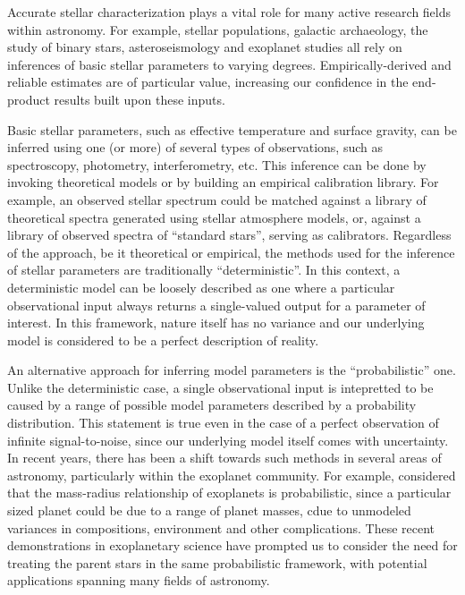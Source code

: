 
Accurate stellar characterization plays a vital role for many active research
fields within astronomy. For example, stellar populations, galactic archaeology,
the study of binary stars, asteroseismology and exoplanet studies all rely on
inferences of basic stellar parameters to varying degrees. Empirically-derived
and reliable estimates are of particular value, increasing our confidence in the
end-product results built upon these inputs.

Basic stellar parameters, such as effective temperature and surface gravity,
can be inferred using one (or more) of several types of observations, such as
spectroscopy, photometry, interferometry, etc. This inference can be done by
invoking theoretical models or by building an empirical calibration library.
For example, an observed stellar spectrum could be matched against a library of
theoretical spectra generated using stellar atmosphere models, or, against a
library of observed spectra of ``standard stars'', serving as calibrators.
Regardless of the approach, be it theoretical or empirical, the methods used
for the inference of stellar parameters are traditionally ``deterministic''.
In this context, a deterministic model can be loosely described as one where
a particular observational input always returns a single-valued output for a
parameter of interest. In this framework, nature itself has no variance and
our underlying model is considered to be a perfect description of reality.

An alternative approach for inferring model parameters is the
``probabilistic'' one. Unlike the deterministic case, a single observational
input is intepretted to be caused by a range of possible model parameters
described by a probability distribution. This statement is true even in the case
of a perfect observation of infinite signal-to-noise, since our underlying
model itself comes with uncertainty. In recent years, there has been a shift
towards such methods in several areas of astronomy, particularly within the
exoplanet community. For example, \citet{wolfgang:2015} considered that
the mass-radius relationship of exoplanets is probabilistic, since a particular
sized planet could be due to a range of planet masses, cdue to unmodeled
variances in compositions, environment and other complications. These recent
demonstrations in exoplanetary science have prompted us to consider the need for
treating the parent stars in the same probabilistic framework, with potential
applications spanning many fields of astronomy.

